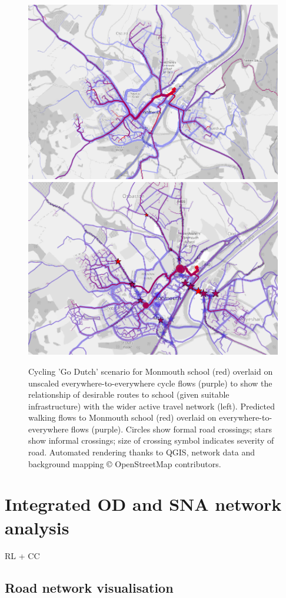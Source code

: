 \documentclass[galley]{jtlu-article-2col}
\begin{document}
\begin{figure}

{\centering \includegraphics[width=0.49\linewidth]{figures/sdnaresult} \includegraphics[width=0.49\linewidth]{figures/sdnaresult2} 

}

\caption{Cycling 'Go Dutch' scenario for Monmouth school (red) overlaid on unscaled everywhere-to-everywhere cycle flows (purple) to show the relationship of desirable routes to school (given suitable infrastructure) with the wider active travel network (left). Predicted walking flows to Monmouth school (red) overlaid on everywhere-to-everywhere flows (purple). Circles show formal road crossings; stars show informal crossings; size of crossing symbol indicates severity of road. Automated rendering thanks to QGIS, network data and background mapping © OpenStreetMap contributors.}\label{fig:sdnaresult}
\end{figure}

\hypertarget{integrated-od-and-sna-network-analysis}{%
\section{Integrated OD and SNA network analysis}\label{integrated-od-and-sna-network-analysis}}

RL + CC

\hypertarget{road-network-visualisation}{%
\subsection{Road network visualisation}\label{road-network-visualisation}}
\end{document}
